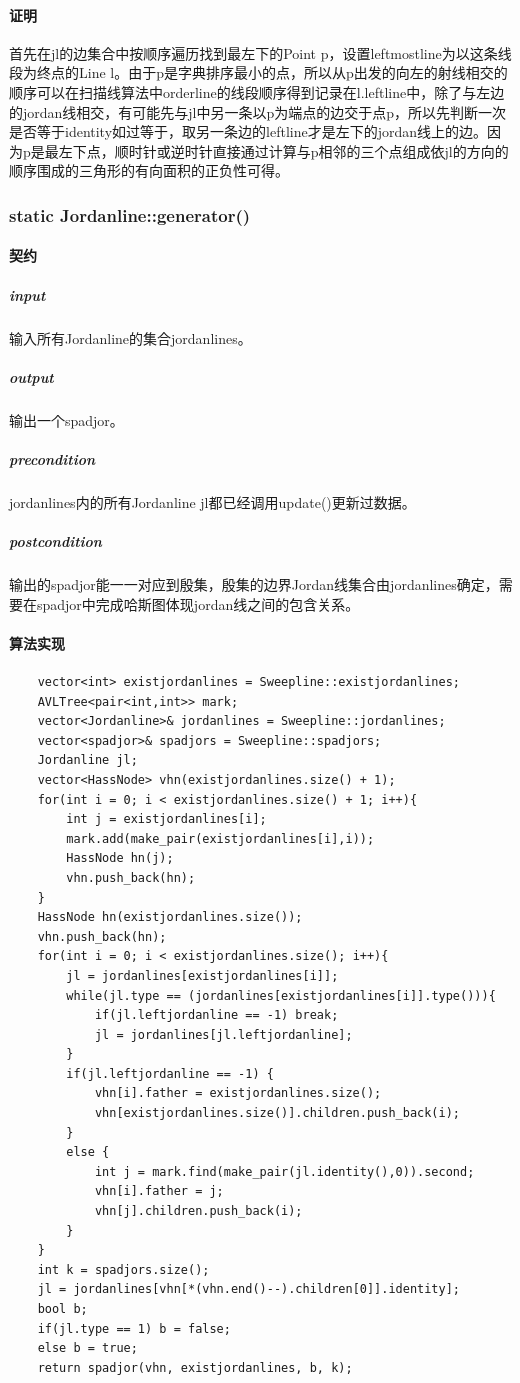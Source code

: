 \documentclass[a4paper]{book}
\numberwithin{equation}{chapter}
\theoremstyle{definition}
\begin{document}
\paragraph{证明}
首先在jl的边集合中按顺序遍历找到最左下的Point p，设置leftmostline为以这条线段为终点的Line l。由于p是字典排序最小的点，所以从p出发的向左的射线相交的顺序可以在扫描线算法中orderline的线段顺序得到记录在l.leftline中，除了与左边的jordan线相交，有可能先与jl中另一条以p为端点的边交于点p，所以先判断一次是否等于identity如过等于，取另一条边的leftline才是左下的jordan线上的边。因为p是最左下点，顺时针或逆时针直接通过计算与p相邻的三个点组成依jl的方向的顺序围成的三角形的有向面积的正负性可得。
\subsubsection{static Jordanline::generator()}
\paragraph{契约}
\subparagraph{input}
输入所有Jordanline的集合jordanlines。
\subparagraph{output}
输出一个spadjor。
\subparagraph{precondition}
jordanlines内的所有Jordanline jl都已经调用update()更新过数据。
\subparagraph{postcondition}
输出的spadjor能一一对应到殷集，殷集的边界Jordan线集合由jordanlines确定，需要在spadjor中完成哈斯图体现jordan线之间的包含关系。
\paragraph{算法实现}
\begin{lstlisting}
	vector<int> existjordanlines = Sweepline::existjordanlines;
	AVLTree<pair<int,int>> mark;
	vector<Jordanline>& jordanlines = Sweepline::jordanlines; 
	vector<spadjor>& spadjors = Sweepline::spadjors;
	Jordanline jl;
	vector<HassNode> vhn(existjordanlines.size() + 1);
	for(int i = 0; i < existjordanlines.size() + 1; i++){
		int j = existjordanlines[i];
		mark.add(make_pair(existjordanlines[i],i));
		HassNode hn(j);
		vhn.push_back(hn);
	}
	HassNode hn(existjordanlines.size());
	vhn.push_back(hn);
	for(int i = 0; i < existjordanlines.size(); i++){
		jl = jordanlines[existjordanlines[i]];
		while(jl.type == (jordanlines[existjordanlines[i]].type())){
			if(jl.leftjordanline == -1) break;
			jl = jordanlines[jl.leftjordanline];
		}
		if(jl.leftjordanline == -1) { 
			vhn[i].father = existjordanlines.size();
			vhn[existjordanlines.size()].children.push_back(i);
		}
		else { 
			int j = mark.find(make_pair(jl.identity(),0)).second;
			vhn[i].father = j;
			vhn[j].children.push_back(i);
		}
	}
	int k = spadjors.size();
	jl = jordanlines[vhn[*(vhn.end()--).children[0]].identity];
	bool b;
	if(jl.type == 1) b = false;
	else b = true;
	return spadjor(vhn, existjordanlines, b, k);
\end{lstlisting}
\end{document}
